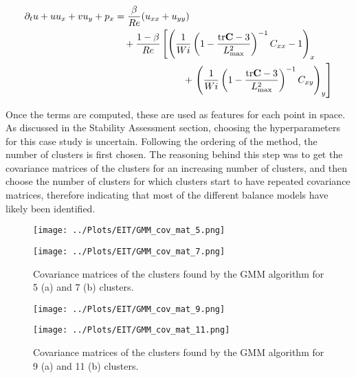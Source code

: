 \documentclass[12pt]{report} %
\begin{document}
\begin{equation}
  \begin{aligned}
  \partial_{t}u + u u_{x} + v u_{y} + p_{x} &= \frac{\beta}{Re} (u_{xx} + u_{yy}) \\
  &\quad + \frac{1 - \beta}{Re} \left[ \left( \frac{1}{Wi} \left(1 - \frac{\text{tr} \mathbf{C} - 3}{L_{\text{max}}^{2}} \right)^{-1} C_{xx} - 1 \right)_{x} \right. \\
  &\hspace{2.5cm} + \left. \left( \frac{1}{Wi} \left(1 - \frac{\text{tr} \mathbf{C} - 3}{L_{\text{max}}^{2}} \right)^{-1} C_{xy} \right)_{y} \right]
  \end{aligned}
\end{equation}

Once the terms are computed, these are used as features for each point in space. As discussed in the Stability Assessment section, choosing the hyperparameters for this case study is uncertain. Following the ordering of the method, the number of clusters is first chosen. The reasoning behind this step was to get the covariance matrices of the clusters for an increasing number of clusters, and then choose the number of clusters for which clusters start to have repeated covariance matrices, therefore indicating that most of the different balance models have likely been identified.

\begin{figure}[htbp]
  \centering
  \begin{minipage}{0.9\textwidth}
    \centering
    \texttt{[image: ../Plots/EIT/GMM\_cov\_mat\_5.png]}
    \subcaption{}
  \end{minipage}

  \begin{minipage}{0.8\textwidth}
    \centering
    \texttt{[image: ../Plots/EIT/GMM\_cov\_mat\_7.png]}
    \subcaption{}
  \end{minipage}

  \caption{Covariance matrices of the clusters found by the GMM algorithm for 5 (a) and 7 (b) clusters.}
  \label{fig:EIT_GMM_results_1}

\end{figure}

\begin{figure}[htbp]
  \centering
  \begin{minipage}{0.7\textwidth}
    \centering
    \texttt{[image: ../Plots/EIT/GMM\_cov\_mat\_9.png]}
    \subcaption{}
  \end{minipage}

  \begin{minipage}{0.9\textwidth}
    \centering
    \texttt{[image: ../Plots/EIT/GMM\_cov\_mat\_11.png]}
    \subcaption{}
  \end{minipage}

  \caption{Covariance matrices of the clusters found by the GMM algorithm for 9 (a) and 11 (b) clusters.}
  \label{fig:EIT_GMM_results_2}

\end{figure}
\end{document}

